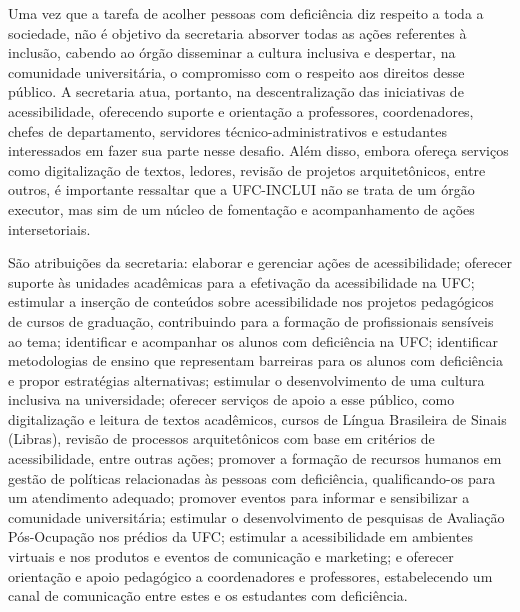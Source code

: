 


Uma vez que a tarefa de acolher pessoas com deficiência diz respeito a toda a sociedade, não é objetivo da secretaria absorver todas as ações referentes à inclusão, cabendo ao órgão disseminar a cultura inclusiva e despertar, na comunidade universitária, o compromisso com o respeito aos direitos desse público. A secretaria atua, portanto, na descentralização das iniciativas de acessibilidade, oferecendo suporte e orientação a professores, coordenadores, chefes de departamento, servidores técnico-administrativos e estudantes interessados em fazer sua parte nesse desafio. Além disso, embora ofereça serviços como digitalização de textos, ledores, revisão de projetos arquitetônicos, entre outros, é importante ressaltar que a UFC-INCLUI não se trata de um órgão executor, mas sim de um núcleo de fomentação e acompanhamento de ações intersetoriais.

São atribuições da secretaria: elaborar e gerenciar ações de acessibilidade; oferecer suporte às unidades acadêmicas para a efetivação da acessibilidade na UFC; estimular a inserção de conteúdos sobre acessibilidade nos projetos pedagógicos de cursos de graduação, contribuindo para a formação de profissionais sensíveis ao tema; identificar e acompanhar os alunos com deficiência na UFC; identificar metodologias de ensino que representam barreiras para os alunos com deficiência e propor estratégias alternativas; estimular o desenvolvimento de uma cultura inclusiva na universidade; oferecer serviços de apoio a esse público, como digitalização e leitura de textos acadêmicos, cursos de Língua Brasileira de Sinais (Libras), revisão de processos arquitetônicos com base em critérios de acessibilidade, entre outras ações; promover a formação de recursos humanos em gestão de políticas relacionadas às pessoas com deficiência, qualificando-os para um atendimento adequado; promover eventos para informar e sensibilizar a comunidade universitária; estimular o desenvolvimento de pesquisas de Avaliação Pós-Ocupação nos prédios da UFC; estimular a acessibilidade em ambientes virtuais e nos produtos e eventos de comunicação e marketing; e oferecer orientação e apoio pedagógico a coordenadores e professores, estabelecendo um canal de comunicação entre estes e os estudantes com deficiência.

